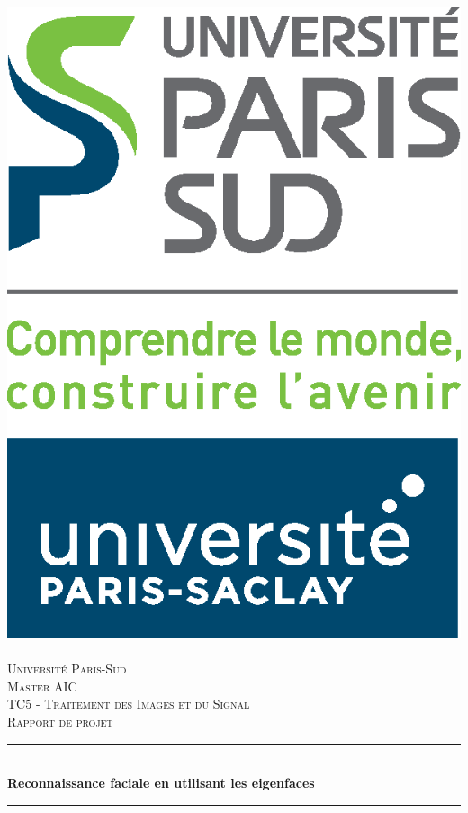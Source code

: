 \begin{titlepage}
  \begin{center}

    \includegraphics[scale=0.5]{images/logo_paris_sud}~\\[0.5cm]

    \textsc{\LARGE Université Paris-Sud}\\[1.25cm]
    
    \textsc{\LARGE Master AIC}\\[0.5cm]

    \textsc{\Large TC5 - Traitement des Images et du Signal}\\[1.5cm]
    
    \textsc{\LARGE Rapport de projet}\\[0.5cm]

    \rule{\linewidth}{0.5mm} \\[0.4cm]
    { \huge \bfseries Reconnaissance faciale en utilisant les eigenfaces\\[0.4cm] }
    \rule{\linewidth}{0.5mm} \\[2cm]


\end{center}
\end{titlepage}
